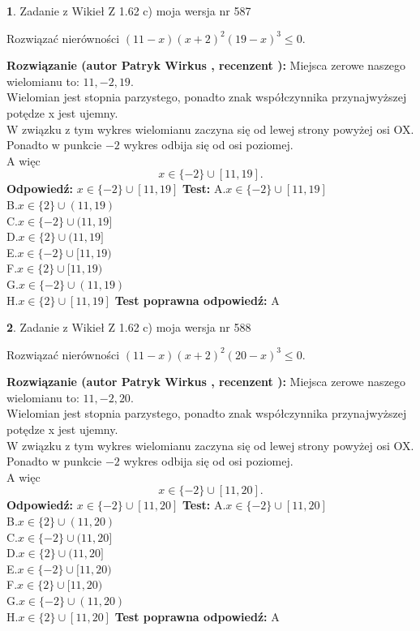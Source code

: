 \documentclass[12pt, a4paper]{article}
\theoremstyle{definition} %
\newtheorem{zad}{}
\newcommand{\zadStart}[1]{\begin{zad}#1\newline}
\newcommand{\zadStop}{\end{zad}}
\newcommand{\rozwStart}[2]{\noindent \textbf{Rozwiązanie (autor #1 , recenzent #2): }\newline}
\newcommand{\rozwStop}{\newline}
\newcommand{\odpStart}{\noindent \textbf{Odpowiedź:}\newline}
\newcommand{\odpStop}{\newline}
\newcommand{\testStart}{\noindent \textbf{Test:}\newline}
\newcommand{\testStop}{\newline}
\newcommand{\kluczStart}{\noindent \textbf{Test poprawna odpowiedź:}\newline}
\newcommand{\kluczStop}{\newline}
\begin{document}
\zadStart{Zadanie z Wikieł Z 1.62 c) moja wersja nr 587}

Rozwiązać nierówności $(11-x)(x+2)^{2}(19-x)^{3}\le0$.
\zadStop
\rozwStart{Patryk Wirkus}{}
Miejsca zerowe naszego wielomianu to: $11, -2, 19$.\\
Wielomian jest stopnia parzystego, ponadto znak współczynnika przy\linebreak najwyższej potędze x jest ujemny.\\ W związku z tym wykres wielomianu zaczyna się od lewej strony powyżej osi OX.\\
Ponadto w punkcie $-2$ wykres odbija się od osi poziomej.\\
A więc $$x \in \{-2\} \cup [11,19].$$
\rozwStop
\odpStart
$x \in \{-2\} \cup [11,19]$
\odpStop
\testStart
A.$x \in \{-2\} \cup [11,19]$\\
B.$x \in \{2\} \cup (11,19)$\\
C.$x \in \{-2\} \cup (11,19]$\\
D.$x \in \{2\} \cup (11,19]$\\
E.$x \in \{-2\} \cup [11,19)$\\
F.$x \in \{2\} \cup [11,19)$\\
G.$x \in \{-2\} \cup (11,19)$\\
H.$x \in \{2\} \cup [11,19]$
\testStop
\kluczStart
A
\kluczStop



\zadStart{Zadanie z Wikieł Z 1.62 c) moja wersja nr 588}

Rozwiązać nierówności $(11-x)(x+2)^{2}(20-x)^{3}\le0$.
\zadStop
\rozwStart{Patryk Wirkus}{}
Miejsca zerowe naszego wielomianu to: $11, -2, 20$.\\
Wielomian jest stopnia parzystego, ponadto znak współczynnika przy\linebreak najwyższej potędze x jest ujemny.\\ W związku z tym wykres wielomianu zaczyna się od lewej strony powyżej osi OX.\\
Ponadto w punkcie $-2$ wykres odbija się od osi poziomej.\\
A więc $$x \in \{-2\} \cup [11,20].$$
\rozwStop
\odpStart
$x \in \{-2\} \cup [11,20]$
\odpStop
\testStart
A.$x \in \{-2\} \cup [11,20]$\\
B.$x \in \{2\} \cup (11,20)$\\
C.$x \in \{-2\} \cup (11,20]$\\
D.$x \in \{2\} \cup (11,20]$\\
E.$x \in \{-2\} \cup [11,20)$\\
F.$x \in \{2\} \cup [11,20)$\\
G.$x \in \{-2\} \cup (11,20)$\\
H.$x \in \{2\} \cup [11,20]$
\testStop
\kluczStart
A
\kluczStop
\end{document}
